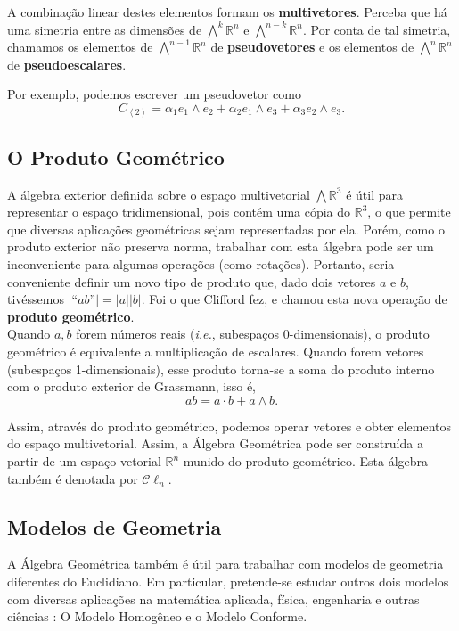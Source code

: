 \documentclass[11pt]{article}
\begin{document}
A combinação linear destes elementos formam os \textbf{multivetores}. Perceba que há uma simetria entre as dimensões de $\bigwedge^k\mathbb{R}^n$ e $\bigwedge^{n-k}\mathbb{R}^n$.
Por conta de tal simetria, chamamos os elementos de $\bigwedge^{n-1}\mathbb{R}^n$ de \textbf{pseudovetores} e os elementos de $\bigwedge^{n}\mathbb{R}^n$ de \textbf{pseudoescalares}.

Por exemplo, podemos escrever um pseudovetor como 
$$C_{\left < 2\right >} = \alpha_1 e_1\wedge e_2 + \alpha_2 e_1 \wedge e_3 + \alpha_3 e_2 \wedge e_3.$$

\subsection{O Produto Geométrico}

A álgebra exterior definida sobre o espaço multivetorial $\bigwedge\mathbb{R}^3$ é útil para representar o espaço tridimensional, pois contém uma cópia do $\mathbb{R}^3$, o que permite que diversas aplicações geométricas sejam representadas por ela. Porém, como o produto exterior não preserva norma, trabalhar com esta álgebra pode ser um inconveniente para algumas operações (como rotações). Portanto, seria conveniente definir um novo tipo de produto que, dado dois vetores $a$ e $b$, tivéssemos $|\text{``}ab\text{''}| = |a||b|$. Foi o que Clifford fez, e chamou esta nova operação de \textbf{produto geométrico}.
\\

Quando $a,b$ forem números reais (\textit{i.e.}, subespaços 0-dimensionais), o produto geométrico é equivalente a multiplicação de escalares. Quando forem vetores (subespaços 1-dimensionais), esse produto torna-se a soma do produto interno com o produto exterior de Grassmann, isso é, $$ab = a\cdot b + a \wedge b.$$

Assim, através do produto geométrico, podemos operar vetores e obter elementos do espaço multivetorial. Assim, a Álgebra Geométrica pode ser construída a partir de um espaço vetorial $\mathbb{R}^n$ munido do produto geométrico. Esta álgebra também é denotada por $\mathcal C \ell_n$.

\subsection{Modelos de Geometria}

A Álgebra Geométrica também é útil para trabalhar com modelos de geometria diferentes do Euclidiano. Em particular, pretende-se estudar outros dois modelos com diversas aplicações na matemática aplicada, física, engenharia e outras ciências \cite{dorst2010geometric}: O Modelo Homogêneo e o Modelo Conforme.
\end{document}
